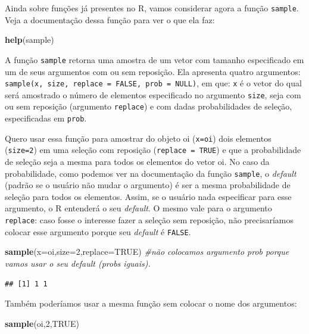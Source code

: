 \documentclass[
]{book}
\newenvironment{Shaded}{\begin{snugshade}}{\end{snugshade}}
\newcommand{\CommentTok}[1]{\textcolor[rgb]{0.56,0.35,0.01}{\textit{#1}}}
\newcommand{\DataTypeTok}[1]{\textcolor[rgb]{0.13,0.29,0.53}{#1}}
\newcommand{\DecValTok}[1]{\textcolor[rgb]{0.00,0.00,0.81}{#1}}
\newcommand{\KeywordTok}[1]{\textcolor[rgb]{0.13,0.29,0.53}{\textbf{#1}}}
\newcommand{\NormalTok}[1]{#1}
\newcommand{\OtherTok}[1]{\textcolor[rgb]{0.56,0.35,0.01}{#1}}
\begin{document}
Ainda sobre funções já presentes no R, vamos considerar agora a função \texttt{sample}. Veja a documentação dessa função para ver o que ela faz:

\begin{Shaded}
\begin{Highlighting}[]
\KeywordTok{help}\NormalTok{(sample)}
\end{Highlighting}
\end{Shaded}

A função \texttt{sample} retorna uma amostra de um vetor com tamanho especificado em um de seus argumentos com ou sem reposição. Ela apresenta quatro argumentos: \texttt{sample(x,\ size,\ replace\ =\ FALSE,\ prob\ =\ NULL)}, em que: \texttt{x} é o vetor do qual será amostrado o número de elementos especificado no argumento \texttt{size}, seja com ou sem reposição (argumento \texttt{replace}) e com dadas probabilidades de seleção, especificadas em \texttt{prob}.

Quero usar essa função para amostrar do objeto oi (\texttt{x=oi}) dois elementos (\texttt{size=2}) em uma seleção com reposição (\texttt{replace\ =\ TRUE}) e que a probabilidade de seleção seja a mesma para todos os elementos do vetor oi. No caso da probabilidade, como podemos ver na documentação da função \texttt{sample}, o \emph{default} (padrão se o usuário não mudar o argumento) é ser a mesma probabilidade de seleção para todos os elementos. Assim, se o usuário nada especificar para esse argumento, o R entenderá o seu \emph{default}. O mesmo vale para o argumento \texttt{replace}: caso fosse o interesse fazer a seleção sem reposição, não precisaríamos colocar esse argumento porque seu \emph{default} é \texttt{FALSE}.

\begin{Shaded}
\begin{Highlighting}[]
\KeywordTok{sample}\NormalTok{(}\DataTypeTok{x=}\NormalTok{oi,}\DataTypeTok{size=}\DecValTok{2}\NormalTok{,}\DataTypeTok{replace=}\OtherTok{TRUE}\NormalTok{) }\CommentTok{#não colocamos argumento prob porque vamos usar o seu default (probs iguais).}
\end{Highlighting}
\end{Shaded}

\begin{verbatim}
## [1] 1 1
\end{verbatim}

Também poderíamos usar a mesma função sem colocar o nome dos argumentos:

\begin{Shaded}
\begin{Highlighting}[]
\KeywordTok{sample}\NormalTok{(oi,}\DecValTok{2}\NormalTok{,}\OtherTok{TRUE}\NormalTok{) }
\end{Highlighting}
\end{Shaded}
\end{document}
